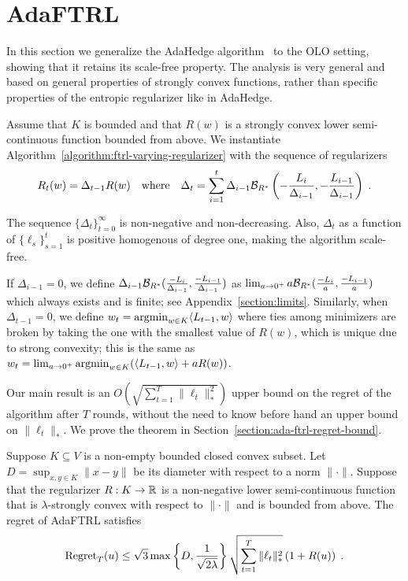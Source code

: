 \section{AdaFTRL}
\label{section:ada-ftrl}

In this section we generalize the AdaHedge
algorithm~\cite{de-Rooij-van-Erven-Grunwald-Koolen-2014} to the OLO setting,
showing that it retains its scale-free property. The analysis is very general
and based on general properties of strongly convex functions, rather than
specific properties of the entropic regularizer like in AdaHedge.

Assume that $K$ is bounded and that $R(w)$ is a strongly convex lower
semi-continuous function bounded from above.  We instantiate
Algorithm~\ref{algorithm:ftrl-varying-regularizer} with the sequence of
regularizers
\begin{equation}
\label{equation:ada-ftrl}
R_t(w) = \Delta_{t-1} R(w)
\quad \text{where}
\quad \Delta_{t}=\sum_{i=1}^{t} \Delta_{i-1} \mathcal{B}_{R^*}\left(- \frac{L_i}{\Delta_{i-1}}, -\frac{L_{i-1}}{\Delta_{i-1}}\right) \; .
\end{equation}

The sequence $\{\Delta_t\}_{t=0}^\infty$ is non-negative and non-decreasing.
Also, $\Delta_t$ as a function of $\{\ell_s\}_{s=1}^t$ is positive homogenous
of degree one, making the algorithm scale-free.

If $\Delta_{i-1} = 0$, we define 
$\Delta_{i-1} \mathcal{B}_{R^*}(\frac{-L_i}{\Delta_{i-1}}, \frac{-L_{i-1}}{\Delta_{i-1}})$ 
as $\lim_{a \to 0^+} a \mathcal{B}_{R^*}(\frac{-L_i}{a}, \frac{-L_{i-1}}{a})$ which always exists and is
finite; see Appendix~\ref{section:limits}.  Similarly, when $\Delta_{t-1} = 0$, we
define $w_t = \operatorname*{argmin}_{w \in K} \langle L_{t-1}, w \rangle$ where ties among
minimizers are broken by taking the one with the smallest value of $R(w)$,
which is unique due to strong convexity; this is the same as $w_t = \lim_{a \to
0^+} \operatorname*{argmin}_{w \in K} (\langle L_{t-1}, w \rangle + aR(w))$.

Our main result is an $O(\sqrt{\sum_{t=1}^T \|\ell_t\|_*^2})$ upper bound on
the regret of the algorithm after $T$ rounds, without the need to know before
hand an upper bound on $\|\ell_t\|_*$.  We prove the theorem in
Section~\ref{section:ada-ftrl-regret-bound}.

\begin{theorem}
\label{theorem:ada-ftrl-regret-bound}
Suppose $K \subseteq V$ is a non-empty bounded closed convex subset. Let $D =
\sup_{x,y \in K} \|x - y\|$ be its diameter with respect to a norm $\|\cdot\|$.
Suppose that the regularizer $R:K \to \mathbb{R}$ is a non-negative lower
semi-continuous function that is $\lambda$-strongly convex with respect to
$\|\cdot\|$ and is bounded from above.  The regret of AdaFTRL satisfies
$$
\operatorname{Regret}_T(u) \le \sqrt{3} \max\left\{D, \frac{1}{\sqrt{2\lambda}} \right\} \sqrt{\sum_{t=1}^T \|\ell_t\|_*^2} \left(1 + R(u) \right) \; .
$$
\end{theorem}

